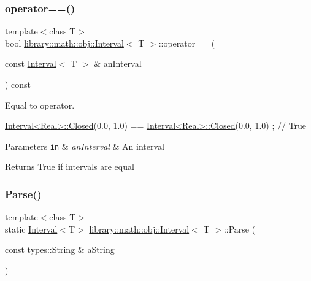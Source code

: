 \subsubsection{\texorpdfstring{operator==()}{operator==()}}
{\footnotesize\ttfamily template$<$class T$>$ \\
bool \hyperlink{classlibrary_1_1math_1_1obj_1_1_interval}{library\+::math\+::obj\+::\+Interval}$<$ T $>$\+::operator== (\begin{DoxyParamCaption}\item[{const \hyperlink{classlibrary_1_1math_1_1obj_1_1_interval}{Interval}$<$ T $>$ \&}]{an\+Interval }\end{DoxyParamCaption}) const}



Equal to operator. 


\begin{DoxyCode}
\hyperlink{classlibrary_1_1math_1_1obj_1_1_interval_aae8bb2b89af450729338d48563def4d7}{Interval<Real>::Closed}(0.0, 1.0) == \hyperlink{classlibrary_1_1math_1_1obj_1_1_interval_aae8bb2b89af450729338d48563def4d7}{Interval<Real>::Closed}(0.0,
       1.0) ; \textcolor{comment}{// True}
\end{DoxyCode}



\begin{DoxyParams}[1]{Parameters}
\mbox{\tt in}  & {\em an\+Interval} & An interval \\
\hline
\end{DoxyParams}
\begin{DoxyReturn}{Returns}
True if intervals are equal 
\end{DoxyReturn}
\mbox{\label{classlibrary_1_1math_1_1obj_1_1_interval_a9ed15c38ee04880a1aba75defa086a79}} 
\subsubsection{\texorpdfstring{Parse()}{Parse()}}
{\footnotesize\ttfamily template$<$class T$>$ \\
static \hyperlink{classlibrary_1_1math_1_1obj_1_1_interval}{Interval}$<$T$>$ \hyperlink{classlibrary_1_1math_1_1obj_1_1_interval}{library\+::math\+::obj\+::\+Interval}$<$ T $>$\+::Parse (\begin{DoxyParamCaption}\item[{const types\+::\+String \&}]{a\+String }\end{DoxyParamCaption})\hspace{0.3cm}{\ttfamily [static]}}



